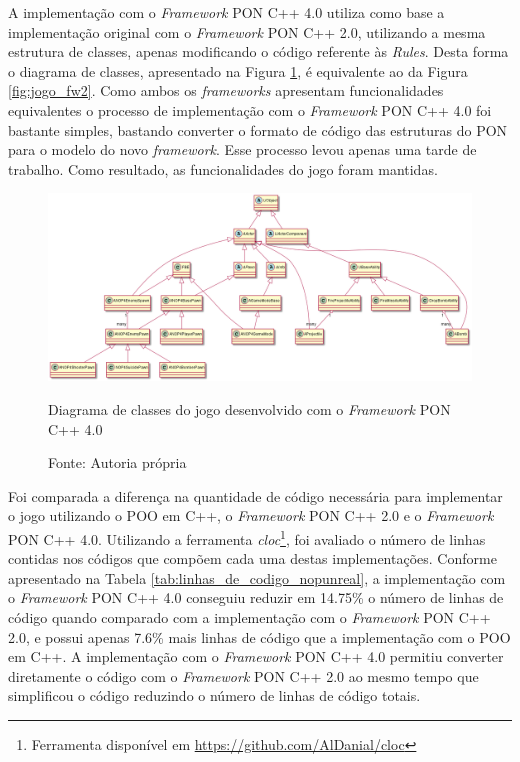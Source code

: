 A implementação com o \textit{Framework} PON C++ 4.0 utiliza
como base a implementação original com o \textit{Framework} PON C++ 2.0,
utilizando a mesma estrutura de classes, apenas modificando o código referente
às \textit{Rules}. Desta forma o diagrama de classes, apresentado na Figura
\ref{fig:jogo_fw4}, é equivalente ao da Figura \ref{fig:jogo_fw2}. 
Como ambos os \textit{frameworks} apresentam funcionalidades equivalentes o
processo de implementação com o \textit{Framework} PON C++ 4.0 foi bastante
simples, bastando converter o formato de código das estruturas do PON para o
modelo do novo \textit{framework}. Esse processo levou apenas uma tarde de
trabalho. Como resultado, as funcionalidades do jogo foram mantidas.

\begin{figure}[!htb]
\centering
\includegraphics[width=\textwidth]{../out/diagrams/class_diagram_nop4/NOP4Unreal.png}
\smallskip
\caption{Diagrama de classes do jogo desenvolvido com o \textit{Framework} PON
C++ 4.0 }
\caption*{Fonte: Autoria própria}
\label{fig:jogo_fw4}
\end{figure}

Foi comparada a diferença na quantidade de código necessária para implementar o
jogo utilizando o POO em C++, o \textit{Framework} PON C++ 2.0 e o
\textit{Framework} PON C++ 4.0. Utilizando a ferramenta
\textit{cloc}\footnote{Ferramenta disponível em
\url{https://github.com/AlDanial/cloc}}, foi avaliado o número de linhas
contidas nos códigos que compõem cada uma destas implementações. Conforme
apresentado na Tabela \ref{tab:linhas_de_codigo_nopunreal}, a implementação com
o \textit{Framework} PON C++ 4.0 conseguiu reduzir em 14.75\% o número de linhas
de código quando comparado com a implementação com o \textit{Framework} PON C++
2.0, e possui apenas 7.6\% mais linhas de código que a implementação com o POO
em C++. A implementação com o \textit{Framework} PON C++ 4.0 permitiu converter
diretamente o código com o \textit{Framework} PON C++ 2.0 ao mesmo tempo que
simplificou o código reduzindo o número de linhas de código totais.

